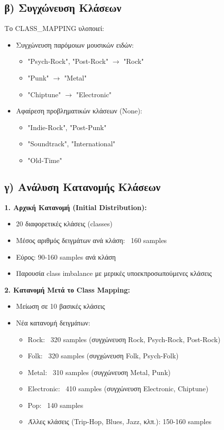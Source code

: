 \documentclass[a4paper,12pt]{article}
\begin{document}
\subsection*{β) Συγχώνευση Κλάσεων}

Το CLASS\_MAPPING υλοποιεί:
\begin{itemize}
    \item Συγχώνευση παρόμοιων μουσικών ειδών:
          \begin{itemize}
              \item "Psych-Rock", "Post-Rock" $\rightarrow$ "Rock"
              \item "Punk" $\rightarrow$ "Metal"
              \item "Chiptune" $\rightarrow$ "Electronic"
          \end{itemize}
    \item Αφαίρεση προβληματικών κλάσεων (None):
          \begin{itemize}
              \item "Indie-Rock", "Post-Punk"
              \item "Soundtrack", "International"
              \item "Old-Time"
          \end{itemize}
\end{itemize}

\subsection*{γ) Ανάλυση Κατανομής Κλάσεων}

\textbf{1. Αρχική Κατανομή (Initial Distribution):}
\begin{itemize}
    \item 20 διαφορετικές κλάσεις (classes)
    \item Μέσος αριθμός δειγμάτων ανά κλάση: ~160 samples
    \item Εύρος: 90-160 samples ανά κλάση
    \item Παρουσία class imbalance με μερικές υποεκπροσωπούμενες κλάσεις
\end{itemize}

\textbf{2. Κατανομή Μετά το Class Mapping:}
\begin{itemize}
    \item Μείωση σε 10 βασικές κλάσεις
    \item Νέα κατανομή δειγμάτων:
          \begin{itemize}
              \item Rock: ~320 samples (συγχώνευση Rock, Psych-Rock, Post-Rock)
              \item Folk: ~320 samples (συγχώνευση Folk, Psych-Folk)
              \item Metal: ~310 samples (συγχώνευση Metal, Punk)
              \item Electronic: ~410 samples (συγχώνευση Electronic, Chiptune)
              \item Pop: ~140 samples
              \item Άλλες κλάσεις (Trip-Hop, Blues, Jazz, κλπ.): 150-160 samples
          \end{itemize}
\end{itemize}
\end{document}
